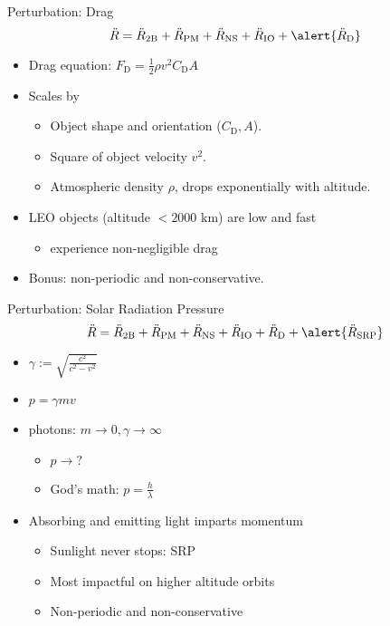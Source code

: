 \documentclass[pdf]{beamer}
\begin{document}
\begin{frame}{Perturbation: Drag}
  \[ \ddot{R} = \ddot{R}_\text{2B} + \ddot{R}_\text{PM} + \ddot{R}_\text{NS}  + \ddot{R}_\text{IO} + \alert{\ddot{R}_\text{D}} \]

  \begin{itemize}
  \item Drag equation: $F_\text{D} = \frac{1}{2}\rho v^2 C_\text{D} A$
  \item Scales by
    \begin{itemize}
    \item Object shape and orientation ($C_\text{D}, A$).
    \item Square of object velocity $v^2$.
    \item Atmospheric density $\rho$, drops exponentially with altitude.
    \end{itemize}
  \item LEO objects (altitude $< 2000$ km) are low and fast
    \begin{itemize}
    \item experience non-negligible drag
    \end{itemize}
  \item Bonus: non-periodic and non-conservative.
  \end{itemize}
\end{frame}

\begin{frame}{Perturbation: Solar Radiation Pressure}
  \[ \ddot{R} = \ddot{R}_\text{2B} + \ddot{R}_\text{PM} + \ddot{R}_\text{NS}  + \ddot{R}_\text{IO} + \ddot{R}_\text{D} + \alert{\ddot{R}_\text{SRP}}\]

  \begin{itemize}
  \item $\gamma := \sqrt{\frac{c^2}{c^2 - v^2}}$
  \item $ p = \gamma m v$
  \item photons: $m\rightarrow0, \gamma \rightarrow \infty $
    \begin{itemize}
    \item $p \rightarrow ?$
    \item God's math: $ p = \frac{h}{\lambda} $
    \end{itemize}
  \item Absorbing and emitting light imparts momentum
    \begin{itemize}
    \item Sunlight never stops: SRP
    \item Most impactful on higher altitude orbits
    \item Non-periodic and non-conservative
    \end{itemize}
  \end{itemize}
\end{frame}
\end{document}
